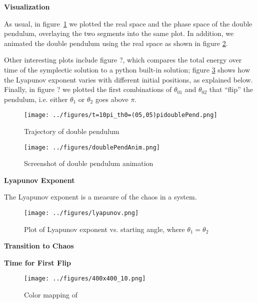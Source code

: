 \begin{problem}{1}
\textbf{Visualization}

As usual, in figure~\ref{double} we plotted the real space and the phase space
of the double pendulum, overlaying the two segments into the same plot. In addition,
we animated the double pendulum using the real space as shown in figure \ref{anim}.

Other interesting plots include figure ?, which compares the total energy over
time of the symplectic solution to a python built-in solution; figure
\ref{lyapunov} shows how the Lyapunov exponent varies with different initial
positions, as explained below. Finally, in figure ? we plotted the first
combinations of $\theta_{01}$ and $\theta_{02}$ that ``flip'' the pendulum, i.e.
either $\theta_1$ or $\theta_2$ goes above $\pi$.

\begin{figure}[ht!]
	\centering
	\texttt{[image: ../figures/t=10pi\_th0=(05,05)pidoublePend.png]}
	\caption{Trajectory of double pendulum}
	\label{double}
\end{figure}

\begin{figure}[ht!]
	\centering
	\texttt{[image: ../figures/doublePendAnim.png]}
	\caption{Screenshot of double pendulum animation}
	\label{anim}
\end{figure}

\end{problem}

\begin{problem}{2}
\textbf{Lyapunov Exponent}

The Lyapunov exponent is a measure of the chaos in a system.  

\begin{figure}[ht!]
	\centering
	\texttt{[image: ../figures/lyapunov.png]}
	\caption{Plot of Lyapunov exponent vs. starting angle, where $\theta_{1}=\theta_{2}$}
	\label{lyapunov}
\end{figure}

\end{problem}

\begin{problem}{3}
\textbf{Transition to Chaos}

\begin{figure}[ht!]
	\centering
	\caption{}
	\label{}
\end{figure}

\end{problem}

\begin{problem}{4}
\textbf{Time for First Flip}

\begin{figure}[ht!]
	\centering
	\texttt{[image: ../figures/400x400\_10.png]}
	\caption{Color mapping of }
	\label{flip}
\end{figure}

\end{problem}

